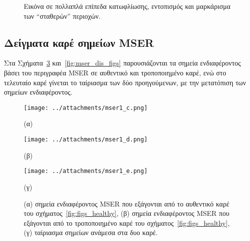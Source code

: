 \newpage

 \begin{figure}[!ht]

\centering     %


\qquad
{}



\caption{Εικόνα σε πολλαπλά επίπεδα κατωφλίωσης, εντοπισμός και μαρκάρισμα των ``σταθερών'' περιοχών.}
\label{fig:mser_cat}

\end{figure} 

\newpage

\subsection{Δείγματα καρέ σημείων MSER}

Στα Σχήματα~\ref{fig:mser_healthy_figs} και~\ref{fig:mser_dis_figs} παρουσιάζονται τα σημεία ενδιαφέροντος βάσει του περιγραφέα MSER σε αυθεντικό και τροποποιημένο καρέ, ενώ στο τελευταίο καρέ 
γίνεται το ταίριασμα των δύο προηγούμενων, με την μετατόπιση των σημείων ενδιαφέροντος.\\



\begin{figure}[!ht]
\begin{minipage}[b]{0.5\linewidth}
\centering
\texttt{[image: ../attachments/mser1\_c.png]}
\caption*{(α)}
\label{fig:mser_1}
\end{minipage}
\hspace{0.9cm}
\begin{minipage}[b]{0.5\linewidth}
\centering
\texttt{[image: ../attachments/mser1\_d.png]}
\caption*{(β)}
\label{fig:mser_2}
\end{minipage}
\end{figure} 


\begin{figure}[!h]
\begin{minipage}[b]{1.0\linewidth}
\centering
\texttt{[image: ../attachments/mser1\_e.png]}
\caption*{(γ)}
\label{fig:mser_3}
\end{minipage}
\caption{
(α) σημεία ενδιαφέροντος MSER που εξάγονται από το αυθεντικό καρέ του σχήματος~\ref{fig:figs_healthy}, 
(β) σημεία ενδιαφέροντος MSER που εξάγονται από το τροποποιημένο καρέ του σχήματος~\ref{fig:figs_healthy}, (γ) ταίριασμα σημείων ανάμεσα στα δυο καρέ.}
\label{fig:mser_healthy_figs}
\end{figure} 
 
